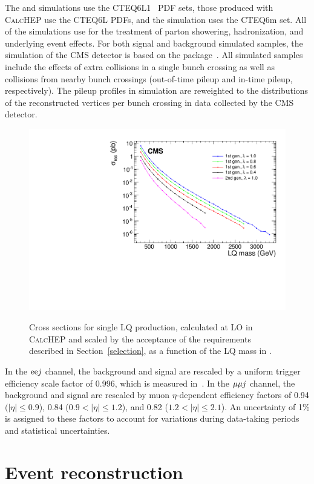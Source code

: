 The \PYTHIA and \MADGRAPH simulations use the CTEQ6L1~\cite{CTEQ} PDF sets, those produced with {{\textsc{CalcHEP}}\xspace} use the CTEQ6L PDFs, and the \POWHEG simulation uses the CTEQ6m set.  All of the simulations use \PYTHIA for the treatment of parton showering, hadronization, and underlying event effects.  For both signal and background simulated samples, the simulation of the CMS detector is based on the \GEANTfour package~\cite{GEANT4}.  All simulated samples include the effects of extra collisions in a single bunch crossing as well as collisions from nearby bunch crossings (out-of-time pileup and in-time pileup, respectively).  The pileup profiles in simulation are reweighted to the distributions of the reconstructed vertices per bunch crossing in data collected by the CMS detector.

\begin{figure}[!h]
       \centering
       {\includegraphics[width=.45\textwidth]{Figures/Figures_CrossSections.pdf}}
       \caption{Cross sections for single LQ production, calculated at LO in {{\textsc{CalcHEP}}\xspace} and scaled by the acceptance of the requirements described in Section~\ref{selection}, as a function of the LQ mass in \GeVns.
	 \label{figapp:CrossSections}}
\end{figure}

In the $\mathrm{e} \mathrm{e} j$ channel, the background and signal are rescaled by a uniform trigger efficiency scale factor of 0.996, which is measured in~\cite{CMS-PAPERS-EXO-12-061}.
In the ${\mu} {\mu} j$ channel, the background and signal are rescaled by muon $\eta$-dependent efficiency factors of 0.94 $(|\eta| \le 0.9$), 0.84 ($0.9 < |\eta| \le 1.2$), and 0.82 ($1.2 < |\eta| \le 2.1$).  An uncertainty of 1\% is assigned to these factors to account for variations during data-taking periods and statistical uncertainties.  

\section{Event reconstruction}
\label{objectreco}


